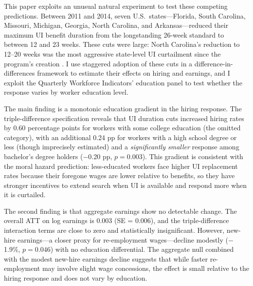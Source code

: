 \documentclass[12pt]{article}
\begin{document}
This paper exploits an unusual natural experiment to test these competing predictions. Between 2011 and 2014, seven U.S.\ states---Florida, South Carolina, Missouri, Michigan, Georgia, North Carolina, and Arkansas---reduced their maximum UI benefit duration from the longstanding 26-week standard to between 12 and 23 weeks. These cuts were large: North Carolina's reduction to 12--20 weeks was the most aggressive state-level UI curtailment since the program's creation \citep{johnston2021unemployment}. I use staggered adoption of these cuts in a difference-in-differences framework \citep{callaway2021difference, goodman2021difference} to estimate their effects on hiring and earnings, and I exploit the Quarterly Workforce Indicators' education panel to test whether the response varies by worker education level.

The main finding is a monotonic education gradient in the hiring response. The triple-difference specification reveals that UI duration cuts increased hiring rates by 0.60 percentage points for workers with some college education (the omitted category), with an additional 0.24 pp for workers with a high school degree or less (though imprecisely estimated) and a \textit{significantly smaller} response among bachelor's degree holders ($-$0.20 pp, $p = 0.003$). This gradient is consistent with the moral hazard prediction: less-educated workers face higher UI replacement rates because their foregone wages are lower relative to benefits, so they have stronger incentives to extend search when UI is available and respond more when it is curtailed.

The second finding is that aggregate earnings show no detectable change. The overall ATT on log earnings is 0.003 (SE = 0.006), and the triple-difference interaction terms are close to zero and statistically insignificant. However, new-hire earnings---a closer proxy for re-employment wages---decline modestly ($-$1.9\%, $p = 0.046$) with no education differential. The aggregate null combined with the modest new-hire earnings decline suggests that while faster re-employment may involve slight wage concessions, the effect is small relative to the hiring response and does not vary by education.
\end{document}
